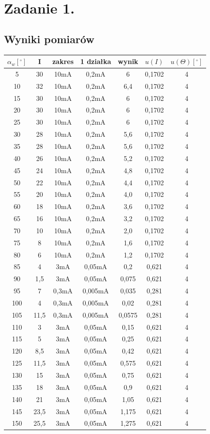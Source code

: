 \documentclass[10pt,a4paper]{article}
\begin{document}
\section{Zadanie 1.}
\subsection{Wyniki pomiarów}
\begin{tabular}{|c|c|c|c|c|c|c|}
$\alpha_w[^\circ]$ & I & zakres & 1 działka & wynik & $u(I)$ & $u(\Theta)[^\circ]$ \\\hline
5 & 30 & 10mA & 0,2mA & 6 & 0,1702 & 4\\
10 & 32 & 10mA& 0,2mA& 6,4 & 0,1702 & 4\\
15 & 30 & 10mA& 0,2mA& 6 & 0,1702 & 4\\
20 & 30 & 10mA& 0,2mA& 6 & 0,1702 & 4\\
25 & 30 & 10mA& 0,2mA& 6 & 0,1702 & 4\\
30 & 28 & 10mA& 0,2mA& 5,6 & 0,1702 & 4\\
35 & 28 & 10mA& 0,2mA& 5,6 & 0,1702 & 4\\
40 & 26 & 10mA& 0,2mA& 5,2 & 0,1702 & 4\\
45 & 24 & 10mA& 0,2mA& 4,8 & 0,1702 & 4\\
50 & 22 & 10mA& 0,2mA& 4,4 & 0,1702 & 4\\
55 & 20 & 10mA& 0,2mA& 4,0 & 0,1702 & 4\\
60 & 18 & 10mA& 0,2mA& 3,6 & 0,1702 & 4\\
65 & 16 & 10mA& 0,2mA& 3,2 & 0,1702 & 4\\
70 & 10 & 10mA& 0,2mA& 2,0 & 0,1702 & 4\\
75 & 8 & 10mA& 0,2mA& 1,6 & 0,1702 & 4\\
80 & 6 & 10mA& 0,2mA& 1,2 & 0,1702 & 4\\
85 & 4 & 3mA & 0,05mA & 0,2 & 0,621 & 4\\
90 & 1,5 & 3mA& 0,05mA & 0,075 & 0,621 & 4\\
95 & 7 & 0,3mA & 0,005mA & 0,035 & 0,281 & 4\\
100 & 4 & 0,3mA& 0,005mA & 0,02 & 0,281 & 4\\
105 & 11,5 & 0,3mA& 0,005mA & 0,0575 & 0,281 & 4\\
110 & 3 & 3mA & 0,05mA & 0,15 & 0,621 & 4\\
115 & 5 & 3mA&  0,05mA& 0,25 & 0,621 & 4\\
120 & 8,5 & 3mA&  0,05mA& 0,42 & 0,621 & 4\\
125 & 11,5 & 3mA& 0,05mA & 0,575 & 0,621 & 4\\
130 & 15 & 3mA& 0,05mA & 0,75 & 0,621 & 4\\
135 & 18 & 3mA& 0,05mA & 0,9 & 0,621 & 4\\
140 & 21 & 3mA& 0,05mA & 1,05 & 0,621 & 4\\
145 & 23,5 & 3mA& 0,05mA & 1,175 & 0,621 & 4\\
150 & 25,5 & 3mA& 0,05mA & 1,275 & 0,621 & 4\\
\end{tabular}
\end{document}

